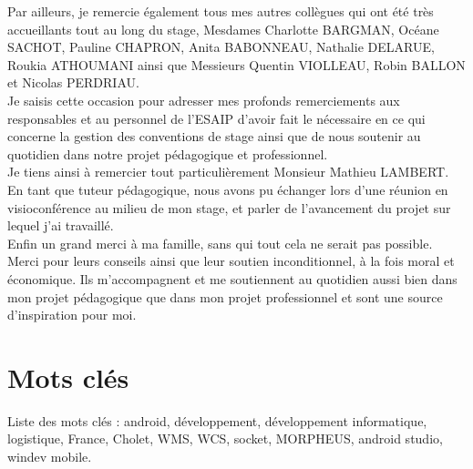 \documentclass[a4paper, 12pt, french]{article}
\begin{document}
	Par ailleurs, je remercie également tous mes autres collègues qui ont été très accueillants tout au long du stage, Mesdames Charlotte BARGMAN, Océane SACHOT, Pauline CHAPRON, Anita BABONNEAU, Nathalie DELARUE, Roukia ATHOUMANI ainsi que Messieurs Quentin VIOLLEAU, Robin BALLON et Nicolas PERDRIAU.\\

	Je saisis cette occasion pour adresser mes profonds remerciements aux responsables et au personnel de l’ESAIP d’avoir fait le nécessaire en ce qui concerne la gestion des conventions de stage ainsi que de nous soutenir au quotidien dans notre projet pédagogique et professionnel.\\

	Je tiens ainsi à remercier tout particulièrement Monsieur Mathieu LAMBERT. En tant que tuteur pédagogique, nous avons pu échanger lors d'une réunion en visioconférence au milieu de mon stage, et parler de l’avancement du projet sur lequel j'ai travaillé.\\

	Enfin un grand merci à ma famille, sans qui tout cela ne serait pas possible. Merci pour leurs conseils ainsi que leur soutien inconditionnel, à la fois moral et économique. Ils m’accompagnent et me soutiennent au quotidien aussi bien dans mon projet pédagogique que dans mon projet professionnel et sont une source d’inspiration pour moi.

	\newpage

	\section*{Mots clés}
	Liste des mots clés : android, développement, développement informatique, logistique, France, Cholet, WMS, WCS, socket, MORPHEUS, android studio, windev mobile.

	\newpage
	
	\doublespacing
	\tableofcontents

	\newpage
		
	
	\listoffigures
			

	
	\newpage

	\printglossary
\end{document}
